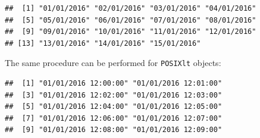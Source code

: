 \documentclass[11pt,]{book}
\newenvironment{Shaded}{\begin{snugshade}}{\end{snugshade}}
\newcommand{\KeywordTok}[1]{\textcolor[rgb]{0.27,0.27,0.27}{\textbf{#1}}}
\newcommand{\DataTypeTok}[1]{\textcolor[rgb]{0.27,0.27,0.27}{#1}}
\newcommand{\DecValTok}[1]{\textcolor[rgb]{0.06,0.06,0.06}{#1}}
\newcommand{\StringTok}[1]{\textcolor[rgb]{0.5,0.5,0.5}{#1}}
\newcommand{\CommentTok}[1]{\textcolor[rgb]{0.56,0.35,0.01}{\textit{#1}}}
\newcommand{\OperatorTok}[1]{\textcolor[rgb]{0.81,0.36,0.00}{\textbf{#1}}}
\newcommand{\NormalTok}[1]{#1}
\begin{document}
\begin{Shaded}
\end{Shaded}

\begin{verbatim}
##  [1] "01/01/2016" "02/01/2016" "03/01/2016" "04/01/2016"
##  [5] "05/01/2016" "06/01/2016" "07/01/2016" "08/01/2016"
##  [9] "09/01/2016" "10/01/2016" "11/01/2016" "12/01/2016"
## [13] "13/01/2016" "14/01/2016" "15/01/2016"
\end{verbatim}

The same procedure can be performed for \texttt{POSIXlt} objects:

\begin{Shaded}
\end{Shaded}

\begin{verbatim}
##  [1] "01/01/2016 12:00:00" "01/01/2016 12:01:00"
##  [3] "01/01/2016 12:02:00" "01/01/2016 12:03:00"
##  [5] "01/01/2016 12:04:00" "01/01/2016 12:05:00"
##  [7] "01/01/2016 12:06:00" "01/01/2016 12:07:00"
##  [9] "01/01/2016 12:08:00" "01/01/2016 12:09:00"
\end{verbatim}
\end{document}
